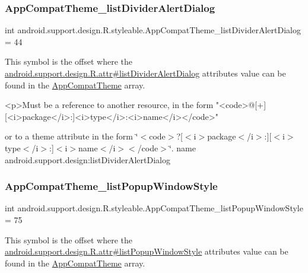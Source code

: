 \subsubsection{\texorpdfstring{App\+Compat\+Theme\+\_\+list\+Divider\+Alert\+Dialog}{AppCompatTheme\_listDividerAlertDialog}}
{\footnotesize\ttfamily int android.\+support.\+design.\+R.\+styleable.\+App\+Compat\+Theme\+\_\+list\+Divider\+Alert\+Dialog = 44\hspace{0.3cm}{\ttfamily [static]}}

This symbol is the offset where the \hyperlink{classandroid_1_1support_1_1design_1_1R_1_1attr_ae516939c27295fc709337c4f1d415514}{android.\+support.\+design.\+R.\+attr\#list\+Divider\+Alert\+Dialog} attribute\textquotesingle{}s value can be found in the \hyperlink{classandroid_1_1support_1_1design_1_1R_1_1styleable_afb351dc8de20cbd4c89abe360373010c}{App\+Compat\+Theme} array.

\begin{DoxyVerb}      <p>Must be a reference to another resource, in the form "<code>@[+][<i>package</i>:]<i>type</i>:<i>name</i></code>"
\end{DoxyVerb}
 or to a theme attribute in the form \char`\"{}$<$code$>$?\mbox{[}$<$i$>$package$<$/i$>$\+:\mbox{]}\mbox{[}$<$i$>$type$<$/i$>$\+:\mbox{]}$<$i$>$name$<$/i$>$$<$/code$>$\char`\"{}.  name android.\+support.\+design\+:list\+Divider\+Alert\+Dialog \mbox{\label{classandroid_1_1support_1_1design_1_1R_1_1styleable_ab38358b7c84d4dbc393c9808d07c0427}} 
\subsubsection{\texorpdfstring{App\+Compat\+Theme\+\_\+list\+Popup\+Window\+Style}{AppCompatTheme\_listPopupWindowStyle}}
{\footnotesize\ttfamily int android.\+support.\+design.\+R.\+styleable.\+App\+Compat\+Theme\+\_\+list\+Popup\+Window\+Style = 75\hspace{0.3cm}{\ttfamily [static]}}

This symbol is the offset where the \hyperlink{classandroid_1_1support_1_1design_1_1R_1_1attr_ae687e51c2385efa82cabc4c678ebcdd5}{android.\+support.\+design.\+R.\+attr\#list\+Popup\+Window\+Style} attribute\textquotesingle{}s value can be found in the \hyperlink{classandroid_1_1support_1_1design_1_1R_1_1styleable_afb351dc8de20cbd4c89abe360373010c}{App\+Compat\+Theme} array.

